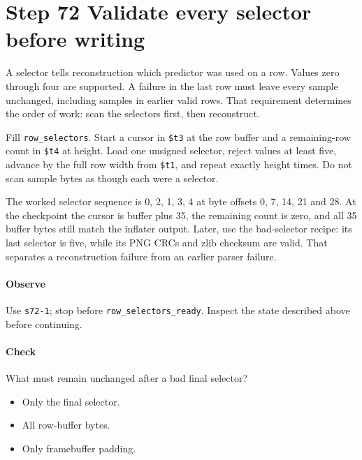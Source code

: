 \section{Step 72 Validate every selector before writing}
A selector tells reconstruction which predictor was used on a row. Values zero through four are supported. A failure in the last row must leave every sample unchanged, including samples in earlier valid rows. That requirement determines the order of work: scan the selectors first, then reconstruct.

Fill \texttt{row\_selectors}. Start a cursor in \texttt{\$t3} at the row buffer and a remaining-row count in \texttt{\$t4} at height. Load one unsigned selector, reject values at least five, advance by the full row width from \texttt{\$t1}, and repeat exactly height times. Do not scan sample bytes as though each were a selector.

The worked selector sequence is 0, 2, 1, 3, 4 at byte offsets 0, 7, 14, 21 and 28. At the checkpoint the cursor is buffer plus 35, the remaining count is zero, and all 35 buffer bytes still match the inflater output. Later, use the bad-selector recipe: its last selector is five, while its PNG CRCs and zlib checksum are valid. That separates a reconstruction failure from an earlier parser failure.

\paragraph{Observe} Use \texttt{s72-1}; stop before \texttt{row\_selectors\_ready}. Inspect the state described above before continuing.

\paragraph{Check} What must remain unchanged after a bad final selector?
\begin{itemize}
  \item[A.] Only the final selector.
  \item[B.] All row-buffer bytes.
  \item[C.] Only framebuffer padding.
\end{itemize}

